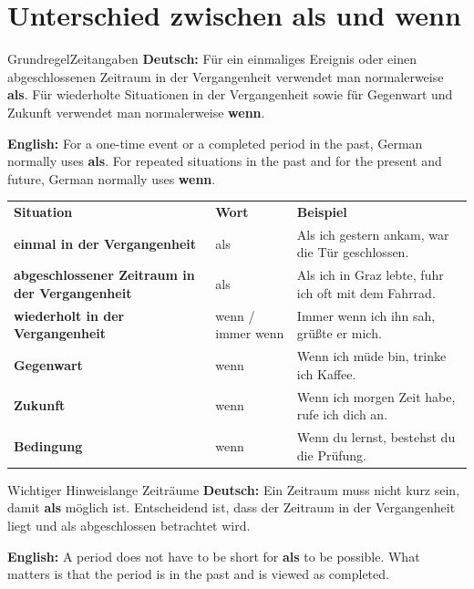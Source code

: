 \documentclass[a4paper,11pt]{article}
\newcommand{\GermanText}[1]{\textbf{Deutsch: }#1\par}
\newcommand{\EnglishText}[1]{{\small\color{SoftGray}\textbf{English: }#1\par}}
\begin{document}
    \section{Unterschied zwischen \glqq als\grqq{} und \glqq wenn\grqq}

        \begin{grammarentry}{Grundregel}{Zeitangaben}
            \GermanText{Für ein einmaliges Ereignis oder einen abgeschlossenen Zeitraum in der Vergangenheit verwendet man normalerweise \textbf{als}. Für wiederholte Situationen in der Vergangenheit sowie für Gegenwart und Zukunft verwendet man normalerweise \textbf{wenn}.}
            \EnglishText{For a one-time event or a completed period in the past, German normally uses \textbf{als}. For repeated situations in the past and for the present and future, German normally uses \textbf{wenn}.}
        \end{grammarentry}

        \begin{longtable}{>{\bfseries}p{4.0cm}|p{3.0cm}|p{8.0cm}}
            \rowcolor{HeaderBlueDark}
            \color{white}\textbf{Situation} &
            \color{white}\textbf{Wort} &
            \color{white}\textbf{Beispiel} \\
            einmal in der Vergangenheit & als & Als ich gestern ankam, war die Tür geschlossen. \\
            abgeschlossener Zeitraum in der Vergangenheit & als & Als ich in Graz lebte, fuhr ich oft mit dem Fahrrad. \\
            wiederholt in der Vergangenheit & wenn / immer wenn & Immer wenn ich ihn sah, grüßte er mich. \\
            Gegenwart & wenn & Wenn ich müde bin, trinke ich Kaffee. \\
            Zukunft & wenn & Wenn ich morgen Zeit habe, rufe ich dich an. \\
            Bedingung & wenn & Wenn du lernst, bestehst du die Prüfung. \\
        \end{longtable}

        \begin{grammarentry}{Wichtiger Hinweis}{lange Zeiträume}
            \GermanText{Ein Zeitraum muss nicht kurz sein, damit \textbf{als} möglich ist. Entscheidend ist, dass der Zeitraum in der Vergangenheit liegt und als abgeschlossen betrachtet wird.}
            \EnglishText{A period does not have to be short for \textbf{als} to be possible. What matters is that the period is in the past and is viewed as completed.}
        \end{grammarentry}
\end{document}
